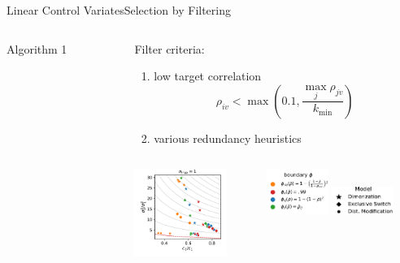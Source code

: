 \documentclass[10pt]{beamer}
\newcommand{\bottomcite}[1]{\vspace*{\fill} {\scriptsize \parencite{#1}}}
\begin{document}
\begin{frame}{Linear Control Variates}{Selection by Filtering}
\begin{columns}
\begin{column}{.4\textwidth}
\begin{block}{Algorithm 1}
\begin{figure}
\begin{tikzpicture}[node distance=1.8cm,
                every node/.style={fill=white, font=\sffamily}, align=center]
                \end{tikzpicture}
                \end{figure}
            \end{block}
        \end{column}
        \begin{column}{.55\textwidth}
            Filter criteria:
            \begin{enumerate}
                \item low target correlation
                    \[ \rho_{iv} < \max \left(0.1, \frac{\max_j \rho_{jv}}{k_{\min}}\right) \]
                \item various redundancy heuristics
            \end{enumerate}
            \vspace{2em}
        \begin{columns}
        \begin{column}{3cm}
            \includegraphics[width=3cm]{../gfx/eff_landscape_order1.pdf}
        \end{column}
        \begin{column}{2cm}
            \includegraphics[width=2cm]{../gfx/legend_1.pdf}
            \includegraphics[width=2cm]{../gfx/legend_models.pdf}
        \end{column}
        \end{columns}
        \end{column}
    \end{columns}
    \bottomcite{backenkohler2019control}
\end{frame}
\end{document}
